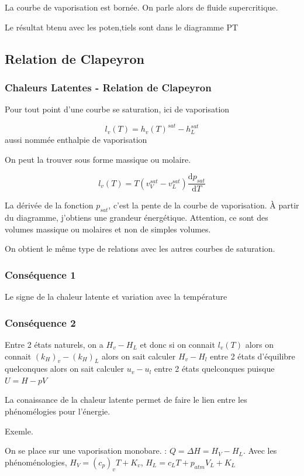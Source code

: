 \documentclass[french]{yLectureNote}
\newcommand{\dd}[0]{\mathrm{d}}
\begin{document}
La courbe de vaporisation est bornée. On parle alors de fluide supercritique.

Le résultat btenu avec les poten,tiels sont dans le diagramme  PT
\subsection{Relation de Clapeyron}
\subsubsection{Chaleurs Latentes - Relation de Clapeyron}
Pour tout point d'une courbe se saturation, ici de vaporisation
\begin{definition}
    $$l_v(T) = h_v(T)^{sat}-h_L^{sat}$$ aussi nommée enthalpie de vaporisation
\end{definition}
On peut la trouver sous forme massique ou molaire.
\begin{theorem}
    $$l_v(T) = T(v_V^{sat}-v_L^{sat})\frac{\dd p_{sat}}{\dd T}$$
\end{theorem}
La dérivée de la fonction $p_{sat}$, c'est la pente de la courbe de vaporisation. À partir du diagramme, j'obtiens une grandeur énergétique. Attention, ce sont des volumes massique ou molaires et non de simples volumes.

On obtient le m\^eme type de relations avec les autres courbes de saturation.

\subsubsection{Conséquence 1 }
Le signe de la chaleur latente et variation avec la température
\subsubsection{Conséquence 2}
Entre 2 états naturels, on a $ H_v-H_L$ et donc si on connait $l_v(T)$ alors on connait $(k_H)_v-(k_H)_L$ alors on sait calculer $H_v-H_l$ entre 2 états d'équilibre quelconques alors on sait calculer 
$u_v-u_l$ entre 2 états quelconques puisque $U=H-pV$

La conaissance de la chaleur latente permet de faire le lien entre les phénomélogies pour l'énergie.

Exemle.

On se place sur une vaporisation monobare. : $Q = \Delta H = H_V-H_L$. Avec les  phénoménologies, $H_V = (c_p)_vT+K_v$, $H_L = c_LT+p_{atm}V_L+K_L$
\end{document}
